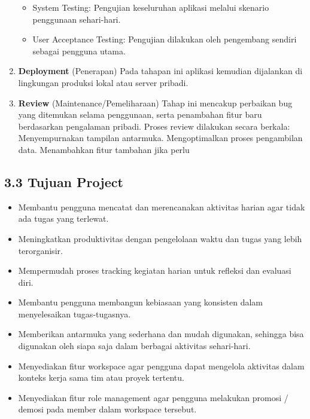 \begin{enumerate}
\begin{itemize}
        \item System Testing: Pengujian keseluruhan aplikasi melalui skenario penggunaan sehari-hari.
        \item User Acceptance Testing: Pengujian dilakukan oleh pengembang sendiri sebagai pengguna utama.
    \end{itemize}
    \item \textbf{Deployment} (Penerapan)
    Pada tahapan ini aplikasi kemudian dijalankan di lingkungan produksi lokal atau server pribadi.
    \item \textbf{Review} (Maintenance/Pemeliharaan)
    Tahap ini mencakup perbaikan bug yang ditemukan selama penggunaan, serta penambahan fitur baru berdasarkan pengalaman pribadi.
    Proses review dilakukan secara berkala: Menyempurnakan tampilan antarmuka.
    Mengoptimalkan proses pengambilan data. 
    Menambahkan fitur tambahan jika perlu
\end{enumerate}


\subsection*{3.3 Tujuan Project}
\begin{itemize}
    \item Membantu pengguna mencatat dan merencanakan aktivitas harian agar tidak ada tugas yang terlewat. 
    \item Meningkatkan produktivitas dengan pengelolaan waktu dan tugas yang lebih terorganisir.
    \item Mempermudah proses tracking kegiatan harian untuk refleksi dan evaluasi diri.
    \item Membantu pengguna membangun kebiasaan yang konsisten dalam menyelesaikan tugas-tugasnya. 
    \item Memberikan antarmuka yang sederhana dan mudah digunakan, sehingga bisa digunakan oleh siapa saja dalam berbagai aktivitas sehari-hari. 
    \item Menyediakan fitur workspace agar pengguna dapat mengelola aktivitas dalam konteks kerja sama tim atau proyek tertentu.
    \item Menyediakan fitur role management agar pengguna melakukan promosi / demosi pada member dalam workspace tersebut.
\end{itemize}

